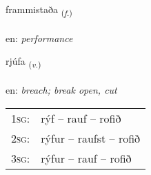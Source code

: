 \documentclass[frontgrid, backgrid]{flacards}\usepackage[]{graphicx}\usepackage[]{xcolor}
\begin{document}
\renewcommand{\flhead}{\vskip5pt \fboxsep=0pt {\small\bfseries\footnotesize Nafnorð | Noun}}
\renewcommand{\fcfoot}{\vskip5pt \fboxsep=0pt \hspace{2pt}{\small\bfseries\footnotesize 3K}}

\renewcommand{\blhead}{\vskip5pt {\small\bfseries\footnotesize Nafnorð | Noun }}
\renewcommand{\bcfoot}{\vskip5pt \hspace{2pt}{\small\bfseries\footnotesize 3K}}


{frammistaða \small{\textsubscript{(\textit{f.})}} \\[1ex] %
\textphonetic{[framɪstaða]} \\
en: \emph{performance} \\  [2ex]
\renewcommand*{\arraystretch}{0.8}
}

\renewcommand{\flhead}{\vskip5pt \fboxsep=0pt {\small\bfseries\footnotesize Sagnorð | Verb}}
\renewcommand{\fcfoot}{\vskip5pt \fboxsep=0pt \hspace{2pt}{\small\bfseries\footnotesize 3K}}

\renewcommand{\blhead}{\vskip5pt {\small\bfseries\footnotesize Sagnorð | Verb }}
\renewcommand{\bcfoot}{\vskip5pt \hspace{2pt}{\small\bfseries\footnotesize 3K}}


{rjúfa \small{\textsubscript{(\textit{v.})}} \\[1ex] %
\textphonetic{[rjuːva]} \\
en: \emph{breach; break open, cut} \\  [2ex]
\renewcommand*{\arraystretch}{0.8}
\begin{tabular}{p{1cm}l}
\textsc{1sg}: & rýf -- rauf -- rofið \\ 
\textsc{2sg}: & rýfur -- raufst -- rofið \\ 
\textsc{3sg}: & rýfur -- rauf -- rofið \\ 
\end{tabular}
}
\end{document}
